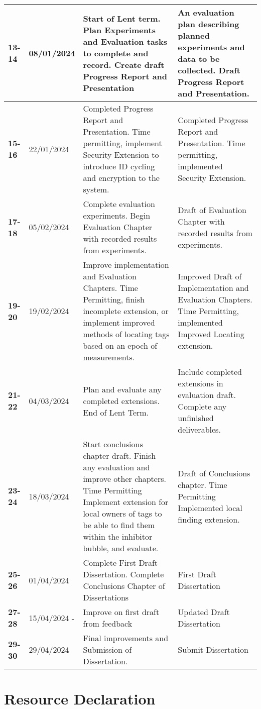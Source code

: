 \documentclass{article}
\begin{document}
\begin{table}[!ht]
\begin{tabular}{|l|l|p{7cm}|p{7cm}|}
        \textbf{13-14} & 08/01/2024 & Start of Lent term. Plan Experiments and Evaluation tasks to complete and record. Create draft Progress Report and Presentation & An evaluation plan describing planned experiments and data to be collected.  Draft Progress Report and Presentation. \\ \hline
        \textbf{15-16} & 22/01/2024 & Completed Progress Report and Presentation. Time permitting, implement Security Extension to introduce ID cycling and encryption to the system.  & Completed Progress Report and Presentation. Time permitting, implemented Security Extension. \\ \hline
        \textbf{17-18} & 05/02/2024 & Complete evaluation experiments. Begin Evaluation Chapter with recorded results from experiments. & Draft of Evaluation Chapter with recorded results from experiments. \\ \hline
        \textbf{19-20} & 19/02/2024 & Improve implementation and Evaluation Chapters. Time Permitting, finish incomplete extension, or implement improved methods of locating tags based on an epoch of measurements. & Improved Draft of Implementation and Evaluation Chapters. Time Permitting, implemented  Improved Locating extension.   \\ \hline
        \textbf{21-22} & 04/03/2024 & Plan and evaluate any completed extensions.  End of Lent Term. & Include completed extensions in evaluation draft. Complete any unfinished deliverables. \\ \hline
        \textbf{23-24} & 18/03/2024 &  Start conclusions chapter draft. Finish any evaluation and improve other chapters. Time Permitting Implement extension for local owners of tags to be able to find them within the inhibitor bubble, and evaluate. & Draft of Conclusions chapter. Time Permitting Implemented local finding extension. \\ \hline
        \textbf{25-26} & 01/04/2024 & Complete First Draft Dissertation. Complete Conclusions Chapter of Dissertations & First Draft Dissertation \\ \hline
        \textbf{27-28} & 15/04/2024 -  & Improve on first draft from feedback & Updated Draft Dissertation \\ \hline
        \textbf{29-30} & 29/04/2024 & Final improvements and Submission of Dissertation. & Submit Dissertation \\ \hline
    \end{tabular}
\end{table}
\section{Resource Declaration}
\end{document}

